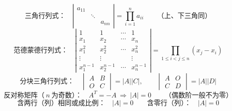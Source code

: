 \begin{secbox}
\begin{formbox}
\renewcommand{\arraystretch}{1.6}
\[
\text{三角行列式：}\quad
\left|\begin{matrix}a_{11}& & \\ &\ddots& \\ &&a_{nn}\end{matrix}\right|
=\prod_{i=1}^{n}a_{ii}
\qquad\text{（上、下三角同）}
\]
\[
\text{范德蒙德行列式：}\quad
\left|\begin{matrix}
1&1&\cdots&1\\
x_{1}&x_{2}&\cdots&x_{n}\\
x_{1}^{2}&x_{2}^{2}&\cdots&x_{n}^{2}\\
\vdots&\vdots&&\vdots\\
x_{1}^{n-1}&x_{2}^{n-1}&\cdots&x_{n}^{n-1}
\end{matrix}\right|
=\prod_{1\le i<j\le n}\left(x_{j}-x_{i}\right)
\]
\[
\text{分块三角行列式：}\quad
\begin{vmatrix}A&B\\ O&C\end{vmatrix}=|A||C|,
\qquad
\begin{vmatrix}A&O\\ C&D\end{vmatrix}=|A||D|
\]
\[
\text{反对称矩阵（}\ n\ \text{为奇数）：}\quad
A^{T}=-A\ \Rightarrow\ |A|=0
\qquad
\text{（偶数阶一般不为零）}
\]
\[
\text{含两行（列）相同或成比例：}\quad |A|=0
\qquad
\text{含零行（列）：}\quad |A|=0
\]
\end{formbox}
\end{secbox}


